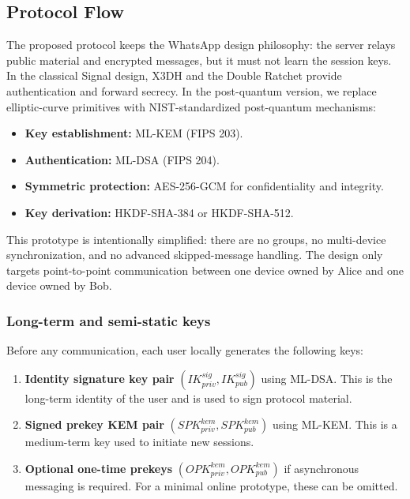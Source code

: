 \documentclass{article}
\begin{document}
      \subsection{Protocol Flow }
      The proposed protocol keeps the WhatsApp design philosophy: the server
      relays public material and encrypted messages, but it must not learn the
      session keys. In the classical Signal design, X3DH and the Double Ratchet
      provide authentication and forward secrecy. In the post-quantum version,
      we replace elliptic-curve primitives with NIST-standardized post-quantum
      mechanisms:
      \begin{itemize}
            \item \textbf{Key establishment:} ML-KEM (FIPS 203).
            \item \textbf{Authentication:} ML-DSA (FIPS 204).
            \item \textbf{Symmetric protection:} AES-256-GCM for confidentiality
                  and integrity.
            \item \textbf{Key derivation:} HKDF-SHA-384 or HKDF-SHA-512.
      \end{itemize}

      This prototype is intentionally simplified: there are no groups, no
      multi-device synchronization, and no advanced skipped-message handling.
      The design only targets point-to-point communication between one device
      owned by Alice and one device owned by Bob.

      \subsubsection{Long-term and semi-static keys}
      Before any communication, each user locally generates the following keys:
      \begin{enumerate}
            \item \textbf{Identity signature key pair}
                  $(IK^{sig}_{priv}, IK^{sig}_{pub})$ using ML-DSA. This is the
                  long-term identity of the user and is used to sign protocol
                  material.
            \item \textbf{Signed prekey KEM pair}
                  $(SPK^{kem}_{priv}, SPK^{kem}_{pub})$ using ML-KEM. This is a
                  medium-term key used to initiate new sessions.
            \item \textbf{Optional one-time prekeys}
                  $(OPK^{kem}_{priv}, OPK^{kem}_{pub})$ if asynchronous messaging
                  is required. For a minimal online prototype, these can be
                  omitted.
      \end{enumerate}
\end{document}
